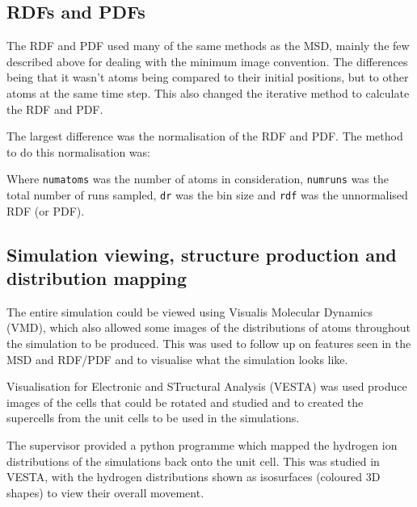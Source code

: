 \documentclass[a4paper,12pt]{article}
\begin{document}
\subsection{RDFs and PDFs}

The RDF and PDF used many of the same methods as the MSD, mainly the few described above for dealing with the minimum image convention. The differences being that it wasn't atoms being compared to their initial positions, but to other atoms at the same time step. This also changed the iterative method to calculate the RDF and PDF.

The largest difference was the normalisation of the RDF and PDF. The method to do this normalisation was:

\smallskip

\smallskip

Where \texttt{numatoms} was the number of atoms in consideration, \texttt{numruns} was the total number of runs sampled, \texttt{dr} was the bin size and \texttt{rdf} was the unnormalised RDF (or PDF).

\subsection{Simulation viewing, structure production and distribution mapping}

The entire simulation could be viewed using Visualis Molecular Dynamics (VMD), which also allowed some images of the distributions of atoms throughout the simulation to be produced. This was used to follow up on features seen in the MSD and RDF/PDF and to visualise what the simulation looks like.

Visualisation for Electronic and STructural Analysis (VESTA) was used produce images of the cells that could be rotated and studied and to created the supercells from the unit cells to be used in the simulations.

The supervisor provided a python programme which mapped the hydrogen ion distributions of the simulations back onto the unit cell. This was studied in VESTA, with the hydrogen distributions shown as isosurfaces (coloured 3D shapes) to view their overall movement.


\newpage
\end{document}
